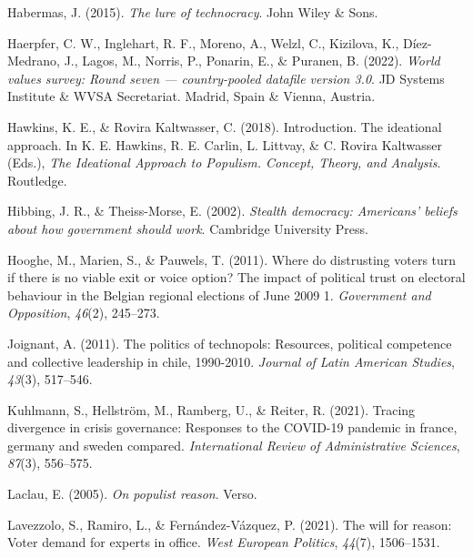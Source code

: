 \documentclass[
  12pt,
  english,
]{article}
\newlength{\cslhangindent}
\newlength{\cslentryspacingunit} %
\newenvironment{CSLReferences}[2] %
 {%
  \setlength{\parindent}{0pt}
  \ifodd #1
  \let\oldpar\par
  \def\par{\hangindent=\cslhangindent\oldpar}
  \fi
  \setlength{\parskip}{#2\cslentryspacingunit}
 }%
 {}
\begin{document}
\begin{CSLReferences}{1}{0}
\leavevmode{}%
Habermas, J. (2015). \emph{The lure of technocracy}. John Wiley \& Sons.

\leavevmode{}%
Haerpfer, C. W., Inglehart, R. F., Moreno, A., Welzl, C., Kizilova, K.,
Díez-Medrano, J., Lagos, M., Norris, P., Ponarin, E., \& Puranen, B.
(2022). \emph{World values survey: Round seven --- country-pooled
datafile version 3.0}. JD Systems Institute \& WVSA Secretariat. Madrid,
Spain \& Vienna, Austria.

\leavevmode{}%
Hawkins, K. E., \& Rovira Kaltwasser, C. (2018). Introduction. The
ideational approach. In K. E. Hawkins, R. E. Carlin, L. Littvay, \& C.
Rovira Kaltwasser (Eds.), \emph{{The Ideational Approach to Populism.
Concept, Theory, and Analysis}}. Routledge.

\leavevmode{}%
Hibbing, J. R., \& Theiss-Morse, E. (2002). \emph{Stealth democracy:
Americans' beliefs about how government should work}. Cambridge
University Press.

\leavevmode{}%
Hooghe, M., Marien, S., \& Pauwels, T. (2011). {Where do distrusting
voters turn if there is no viable exit or voice option? The impact of
political trust on electoral behaviour in the Belgian regional elections
of June 2009 1}. \emph{Government and Opposition}, \emph{46}(2),
245--273.

\leavevmode{}%
Joignant, A. (2011). The politics of technopols: Resources, political
competence and collective leadership in chile, 1990-2010. \emph{Journal
of Latin American Studies}, \emph{43}(3), 517--546.

\leavevmode{}%
Kuhlmann, S., Hellström, M., Ramberg, U., \& Reiter, R. (2021). Tracing
divergence in crisis governance: Responses to the COVID-19 pandemic in
france, germany and sweden compared. \emph{International Review of
Administrative Sciences}, \emph{87}(3), 556--575.

\leavevmode{}%
Laclau, E. (2005). \emph{On populist reason}. Verso.

\leavevmode{}%
Lavezzolo, S., Ramiro, L., \& Fernández-Vázquez, P. (2021). The will for
reason: Voter demand for experts in office. \emph{West European
Politics}, \emph{44}(7), 1506--1531.


\end{CSLReferences}
\end{document}
